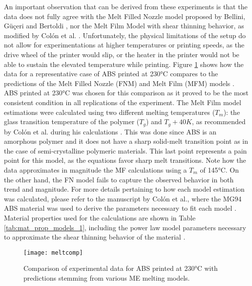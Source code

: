 \documentclass[main.tex]{subfiles}
\begin{document}
An important observation that can be derived from these experiments is that the data does not fully agree with the Melt Filled Nozzle model proposed by Bellini, Güçeri and Bertoldi \cite{Bellini2004}, nor the Melt Film Model with shear thinning behavior, as modified by Colón et al. \cite{ColonQuintana2020}. Unfortunately, the physical limitations of the setup do not allow for experimentations at higher temperatures or printing speeds, as the drive wheel of the printer would slip, or the heater in the printer would not be able to sustain the elevated temperature while printing. Figure \ref{fig:meltmcomp} shows how the data for a representative case of ABS printed at 230°C compares to the predictions of the Melt Filled Nozzle (FNM) and Melt Film (MFM) models \cite{Bellini2004, OsswaldMelting18, ColonQuintana2020}. ABS printed at 230°C was chosen for this comparison as it proved to be the most consistent condition in all replications of the experiment. The Melt Film model estimations were calculated using two different melting temperatures ($T_m$): the glass transition temperature of the polymer ($T_g$) and $T_g+40K$, as recommended by Colón et al. during his calculations \cite{ColonQuintana2020}. This was done since ABS is an amorphous polymer and it does not have a sharp solid-melt transition point as in the case of semi-crystalline polymeric materials. This last point represents a pain point for this model, as the equations favor sharp melt transitions. Note how the data approximates in magnitude the MF calculations using a $T_m$ of 145°C. On the other hand, the FN model fails to capture the observed behavior in both trend and magnitude. For more details pertaining to how each model estimation was calculated, please refer to the manuscript by Colón et al., where the MG94 ABS material was used to derive the parameters necessary to fit each model \cite{ColonQuintana2020}. Material properties used for the calculations are shown in Table \ref{tab:mat_prop_models_1}, including the power law model parameters necessary to approximate the shear thinning behavior of the material \cite{ColonQuintana2020}.

\begin{figure}[!htbp]
	\center
	\texttt{[image: meltcomp]}
	\caption{Comparison of experimental data for ABS printed at 230°C with predictions stemming from various ME melting models.} \label{fig:meltmcomp}
\end{figure}
\end{document}
